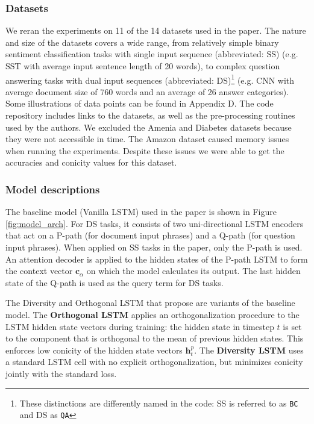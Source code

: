 \subsubsection{Datasets}
We reran the experiments on 11 of the 14 datasets used in the paper. The nature and size of the datasets covers a wide range, from relatively simple binary sentiment classification tasks with single input sequence (abbreviated: SS) (e.g. SST with average input sentence length of 20 words), to complex question answering tasks with dual input sequences (abbreviated: DS)\footnote{\scriptsize{These distinctions are differently named in the code: SS is referred to as \texttt{BC} and DS as \texttt{QA}}} (e.g. CNN with average document size of 760 words and an average of 26 answer categories). Some illustrations of data points can be found in Appendix D. The code repository includes links to the datasets, as well as the pre-processing routines used by the authors. We excluded the Amenia and Diabetes datasets because they were not accessible in time. The Amazon dataset caused memory issues when running the experiments. Despite these issues we were able to get the accuracies and conicity values for this dataset.

\subsubsection{Model descriptions}
The baseline model (Vanilla LSTM) used in the paper is shown in Figure \ref{fig:model_arch}. For DS tasks, it consists of two uni-directional LSTM encoders that act on a P-path (for document input phrases) and a Q-path (for question input phrases). When applied on SS tasks in the paper, only the P-path is used. An attention decoder is applied to the hidden states of the P-path LSTM to form the context vector $\mathbf{c}_\alpha$ on which the model calculates its output. The last hidden state of the Q-path is used as the query term for DS tasks.

The Diversity and Orthogonal LSTM that \citet{mohankumar_towards_2020} propose are variants of the baseline model.
The {\bf Orthogonal LSTM} applies an orthogonalization procedure to the LSTM hidden state vectors during training: the hidden state in timestep $t$ is set to the component that is orthogonal to the mean of previous hidden states. This enforces low conicity of the hidden state vectors $\mathbf{h}^p_t$.
The {\bf Diversity LSTM} uses a standard LSTM cell with no explicit orthogonalization, but minimizes conicity jointly with the standard loss.

